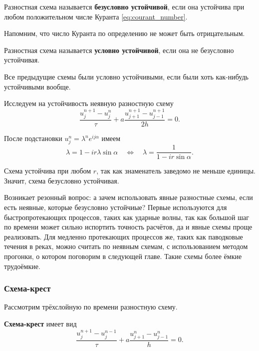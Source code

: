 \documentclass{article}
\begin{document}
\begin{define}
	Разностная схема называется \textbf{безусловно устойчивой}, если она
	устойчива при любом положительном числе Куранта
	\eqref{eq:courant_number}.
\end{define}

Напомним, что число Куранта по определению не может быть отрицательным.

\begin{define}
	Разностная схема называется \textbf{условно устойчивой}, если она не
	безусловно устойчивая.
\end{define}

Все предыдущие схемы были условно устойчивыми, если были хоть как-нибудь
устойчивыми вообще.

\begin{example}
	Исследуем на устойчивость неявную разностную схему
	\[\frac{u_j^{n+1}-u_j^n}{\tau}+a\frac{u_{j+1}^{n+1}-u_{j-1}^{n+1}}{2h}=
	0.\]

	После подстановки $u_j^n=\lambda^ne^{ij\alpha}$ имеем
	\[\lambda=1-ir\lambda\sin\alpha\quad\Leftrightarrow\quad
	\lambda=\frac{1}{1-ir\sin\alpha}.\]

	Схема устойчива при любом $r$, так как знаменатель заведомо не
	меньше единицы. Значит, схема безусловно устойчивая.
\end{example}

Возникает резонный вопрос: а зачем использовать явные разностные схемы, если
есть неявные, которые безусловно устойчиые? Первые используются для
быстропротекающих процессов, таких как ударные волны, так как большой шаг по
времени может сильно испортить точность расчётов, да и явные схемы проще
реализовать. Для медленно протекающих процессов же, таких как паводковые течения
в реках, можно считать по неявным схемам, с использованием методом прогонки,
о котором поговорим в следующей главе. Такие схемы более ёмкие трудоёмкие.

\subsubsection{Схема-крест}
Рассмотрим трёхслойную по времени разностную схему.

\begin{define}
	\textbf{Схема-крест} имеет вид
	\[\frac{u_j^{n+1}-u_j^{n-1}}{\tau}+a\frac{u_{j+1}^n-u_{j-1}^n}{h}=
	0.\]
\end{define}
\end{document}

